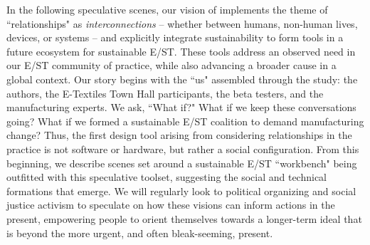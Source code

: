 \documentclass[manuscript,review,anonymous]{acmart}
\begin{document}
In the following speculative scenes, our vision of  implements the theme of ``relationships" as \textit{interconnections} -- whether between humans, non-human lives, devices, or systems -- and explicitly integrate sustainability to form tools in a future ecosystem for sustainable E/ST. These tools address an observed need in our E/ST community of practice, while also advancing a broader cause in a global context. Our story begins with the ``us" assembled through the study: the authors, the E-Textiles Town Hall participants, the beta testers, and the manufacturing experts. We ask, ``What if?" What if we keep these conversations going? What if we formed a sustainable E/ST coalition to demand manufacturing change? Thus, the first design tool arising from considering relationships in the practice is not software or hardware, but rather a social configuration. From this beginning, we describe scenes set around a sustainable E/ST ``workbench" being outfitted with this speculative toolset, suggesting the social and technical formations that emerge. We will regularly look to political organizing and social justice activism to speculate on how these visions can inform actions in the present, empowering people to orient themselves towards a longer-term ideal that is beyond the more urgent, and often bleak-seeming, present.  

\end{document}
